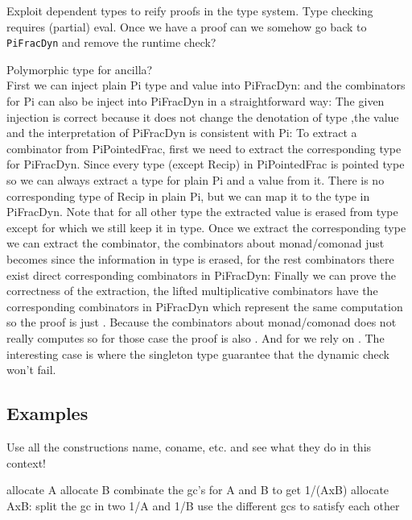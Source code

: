 \documentclass[sigplan,10pt,review,anonymous]{acmart}
\begin{document}
Exploit dependent types to reify proofs in the type system. Type
checking requires (partial) eval. Once we have a proof can we somehow
go back to \verb|PiFracDyn| and remove the runtime check?

Polymorphic type for ancilla?
\\
First we can inject plain Pi type and value into PiFracDyn:
\INJU{}
and the combinators for Pi can also be inject into PiFracDyn in a straightforward way:
\INJcomb{}
The given injection is correct because it does not change the denotation of type
\INJUeq{}
,the value
\INJVeq{}
and the interpretation of PiFracDyn is consistent with Pi:
\INJEvaleq{}
To extract a combinator from PiPointedFrac, first we need to extract the corresponding type for PiFracDyn.
Since every type (except Recip) in PiPointedFrac is pointed type so we can always extract a type for plain
Pi and a value from it.
There is no corresponding type of Recip in plain Pi, but we can map it to the
\AgdaSpace{} type in PiFracDyn.
Note that for all other type the extracted value is erased from type except for
\AgdaSpace{}
which we still keep it in type.
\EXTU{}
Once we extract the corresponding type we can extract the combinator, the combinators about monad/comonad
just becomes  since the information in type is erased,
for the rest combinators there exist direct corresponding combinators in PiFracDyn:
\EXTUComb{}
Finally we can prove the correctness of the extraction,
the lifted multiplicative combinators have the corresponding combinators in PiFracDyn which represent
the same computation so the proof is just .
Because the combinators about monad/comonad does not really
computes so for those case the proof is also .
And for  we rely on .
The interesting case is  where the singleton type guarantee that
the dynamic check won't fail.
\EXTeq{}

\subsection{Examples}
\label{sec:cat}  

Use all the constructions name, coname, etc. and see what they do in this context!  
 
allocate A
allocate B
combinate the gc's for A and B to get 1/(AxB)
allocate AxB: split the gc in two 1/A and 1/B
use the different gcs to satisfy each other
\end{document}
